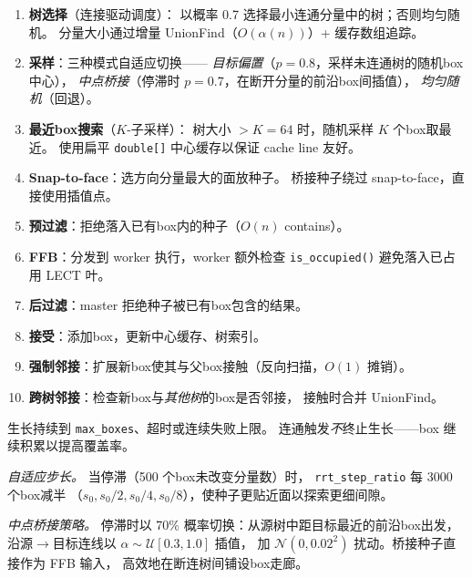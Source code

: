 \documentclass[journal]{IEEEtran}
\begin{document}
\begin{enumerate}[nosep]
  \item \textbf{树选择}（连接驱动调度）：
    以概率 0.7 选择最小连通分量中的树；否则均匀随机。
    分量大小通过增量 UnionFind（$O(\alpha(n))$）+ 缓存数组追踪。

  \item \textbf{采样}：三种模式自适应切换——
    \emph{目标偏置}（$p = 0.8$，采样未连通树的随机box中心），
    \emph{中点桥接}（停滞时 $p = 0.7$，在断开分量的前沿box间插值），
    \emph{均匀随机}（回退）。

  \item \textbf{最近box搜索}（$K$-子采样）：
    树大小 $> K = 64$ 时，随机采样 $K$ 个box取最近。
    使用扁平 \texttt{double[]} 中心缓存以保证 cache line 友好。

  \item \textbf{Snap-to-face}：选方向分量最大的面放种子。
    桥接种子绕过 snap-to-face，直接使用插值点。

  \item \textbf{预过滤}：拒绝落入已有box内的种子（$O(n)$ contains）。

  \item \textbf{FFB}：分发到 worker 执行，worker 额外检查
    \texttt{is\_occupied()} 避免落入已占用 LECT 叶。

  \item \textbf{后过滤}：master 拒绝种子被已有box包含的结果。

  \item \textbf{接受}：添加box，更新中心缓存、树索引。

  \item \textbf{强制邻接}：扩展新box使其与父box接触（反向扫描，$O(1)$ 摊销）。

  \item \textbf{跨树邻接}：检查新box与\emph{其他树}的box是否邻接，
    接触时合并 UnionFind。
\end{enumerate}

生长持续到 \texttt{max\_boxes}、超时或连续失败上限。
连通触发\emph{不}终止生长——box 继续积累以提高覆盖率。

\emph{自适应步长。}
当停滞（500 个box未改变分量数）时，
\texttt{rrt\_step\_ratio} 每 3000 个box减半
（$s_0, s_0/2, s_0/4, s_0/8$），使种子更贴近面以探索更细间隙。

\emph{中点桥接策略。}
停滞时以 70\% 概率切换：从源树中距目标最近的前沿box出发，
沿源$\to$目标连线以 $\alpha \sim \mathcal{U}[0.3, 1.0]$ 插值，
加 $\mathcal{N}(0, 0.02^2)$ 扰动。桥接种子直接作为 FFB 输入，
高效地在断连树间铺设box走廊。
\end{document}
